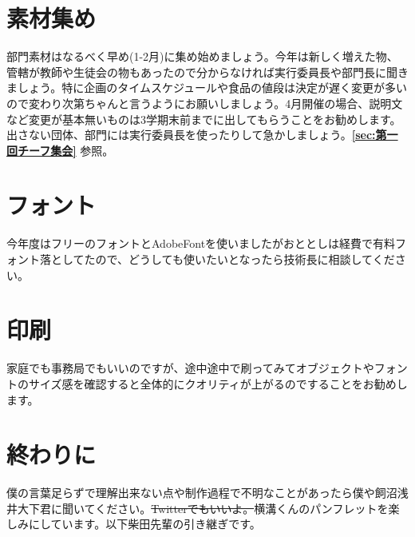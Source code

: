\documentclass[dvipdfmx,jb5]{jarticle}
\begin{document}
\section{素材集め}
部門素材はなるべく早め(1-2月)に集め始めましょう。今年は新しく増えた物、管轄が教師や生徒会の物もあったので分からなければ実行委員長や部門長に聞きましょう。特に企画のタイムスケジュールや食品の値段は決定が遅く変更が多いので変わり次第ちゃんと言うようにお願いしましょう。4月開催の場合、説明文など変更が基本無いものは3学期末前までに出してもらうことをお勧めします。出さない団体、部門には実行委員長を使ったりして急かしましょう。{\bf \ref{sec:第一回チーフ集会}} 参照。

\section{フォント}
今年度はフリーのフォントとAdobeFontを使いましたがおととしは経費で有料フォント落としてたので、どうしても使いたいとなったら技術長に相談してください。

\section{印刷}
家庭でも事務局でもいいのですが、途中途中で刷ってみてオブジェクトやフォントのサイズ感を確認すると全体的にクオリティが上がるのですることをお勧めします。

\section{終わりに}
僕の言葉足らずで理解出来ない点や制作過程で不明なことがあったら僕や飼沼浅井大下君に聞いてください。\sout{Twitterでもいいよ。}横溝くんのパンフレットを楽しみにしています。以下柴田先輩の引き継ぎです。
\end{document}
